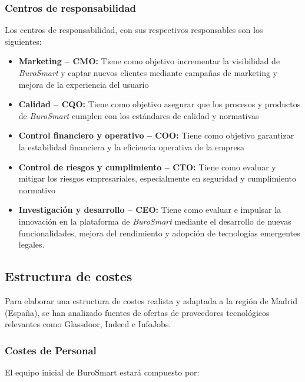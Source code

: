 \subsubsection{Centros de responsabilidad}
Los centros de responsabilidad, con sus respectivos responsables son los siguientes:
\begin{itemize}
  \item \textbf{Marketing -- CMO:} Tiene como objetivo incrementar la visibilidad de \textit{BuroSmart} y captar nuevos clientes mediante campañas de marketing y mejora de la experiencia del usuario
  \item \textbf{Calidad -- CQO:} Tiene como objetivo asegurar que los procesos y productos de \textit{BuroSmart} cumplen con los estándares de calidad y normativas
  \item \textbf{Control financiero y operativo -- COO:} Tiene como objetivo garantizar la estabilidad financiera y la eficiencia operativa de la empresa
  \item \textbf{Control de riesgos y cumplimiento -- CTO:} Tiene como evaluar y mitigar los riesgos empresariales, especialmente en seguridad y cumplimiento normativo
  \item \textbf{Investigación y desarrollo -- CEO:} Tiene como evaluar e impulsar la innovación en la plataforma de \textit{BuroSmart} mediante el desarrollo de nuevas funcionalidades, mejora del rendimiento y adopción de tecnologías emergentes
legales.
\end{itemize}


\subsection{Estructura de costes}

Para elaborar una estructura de costes realista y adaptada a la región de Madrid (España), se han analizado fuentes de ofertas de proveedores tecnológicos relevantes como Glassdoor, Indeed e InfoJobs.

\subsubsection{Costes de Personal}

El equipo inicial de BuroSmart estará compuesto por:

